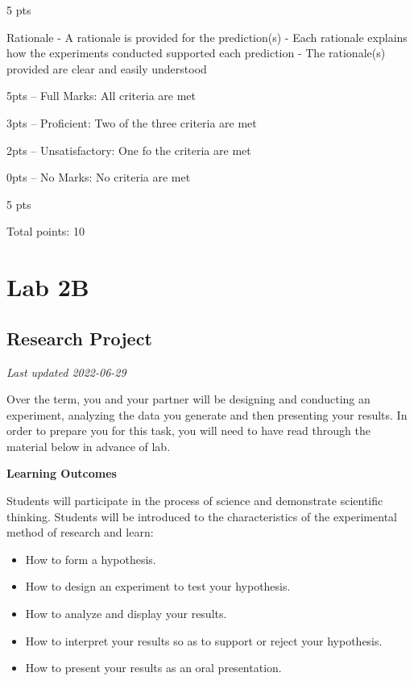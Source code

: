 \documentclass[
]{book}
\providecommand{\tightlist}{%
  \setlength{\itemsep}{0pt}\setlength{\parskip}{0pt}}
\begin{document}
5 pts

Rationale
- A rationale is provided for the prediction(s)
- Each rationale explains how the experiments conducted supported each prediction
- The rationale(s) provided are clear and easily understood

5pts -- Full Marks: All criteria are met

3pts -- Proficient: Two of the three criteria are met

2pts -- Unsatisfactory: One fo the criteria are met

0pts -- No Marks: No criteria are met

5 pts

Total points: 10

\hypertarget{part-lab-2b}{%
\part*{Lab 2B}\label{part-lab-2b}}

\hypertarget{research-project}{%
\chapter*{Research Project}\label{research-project}}

\emph{Last updated 2022-06-29}

Over the term, you and your partner will be designing and conducting an experiment, analyzing the data you generate and then presenting your results. In order to prepare you for this task, you will need to have read through the material below in advance of lab.

\textbf{Learning Outcomes}

Students will participate in the process of science and demonstrate scientific thinking. Students will be introduced to the characteristics of the experimental method of research and learn:

\begin{itemize}
\tightlist
\item
  How to form a hypothesis.
\item
  How to design an experiment to test your hypothesis.
\item
  How to analyze and display your results.
\item
  How to interpret your results so as to support or reject your hypothesis.
\item
  How to present your results as an oral presentation.
\end{itemize}
\end{document}
